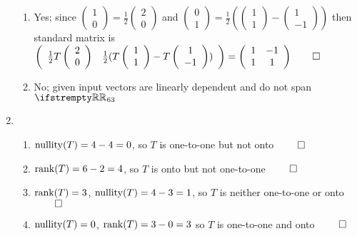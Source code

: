 \documentclass[12pt, a4paper]{article}
\begin{document}
\begin{enumerate}[Q\arabic*.]
\begin{enumerate}[(\alph*)]
      \item Yes; since $\left(\begin{array}{c} 1\\ 0 \end{array}\right) = \frac{1}{2}\left(\begin{array}{c} 2\\ 0 \end{array}\right)$ and $\left(\begin{array}{c} 0\\ 1 \end{array}\right) = \frac{1}{2}(\left(\begin{array}{c} 1\\ 1 \end{array}\right) - \left(\begin{array}{c} 1\\ -1 \end{array}\right))$ then standard matrix is $\left(\begin{array}{cc} \frac{1}{2}T\left(\begin{array}{c} 2\\ 0 \end{array}\right) & \frac{1}{2}(T\left(\begin{array}{c} 1\\ 1 \end{array}\right) - T\left(\begin{array}{c} 1\\ -1 \end{array}\right)) \end{array}\right) = \left(\begin{array}{cc} 1 & -1\\ 1 & 1 \end{array}\right) \qed$

      \item No; given input vectors are linearly dependent and do not span $\RR_{63}$
    \end{enumerate}

  \item 
    \begin{enumerate}[(\alph*)]
      \item $\operatorname{nullity}(T) = 4 - 4 = 0$, so $T$ is one-to-one but not onto $\qed$

      \item $\operatorname{rank}(T) = 6 - 2 = 4$, so $T$ is onto but not one-to-one $\qed$

      \item $\operatorname{rank}(T) = 3$, $\operatorname{nullity}(T) = 4 - 3 = 1$, so $T$ is neither one-to-one or onto $\qed$

      \item $\operatorname{nullity}(T) = 0$, $\operatorname{rank}(T) = 3 - 0 = 3$ so $T$ is one-to-one and onto $\qed$
    \end{enumerate}

\end{enumerate}
\end{document}
